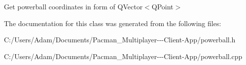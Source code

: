 Get powerball coordinates in form of Q\+Vector$<$\+Q\+Point$>$ 

The documentation for this class was generated from the following files\+:\begin{DoxyCompactItemize}
\item 
C\+:/\+Users/\+Adam/\+Documents/\+Pacman\+\_\+\+Multiplayer-\/-\/-\/\+Client-\/\+App/powerball.\+h\item 
C\+:/\+Users/\+Adam/\+Documents/\+Pacman\+\_\+\+Multiplayer-\/-\/-\/\+Client-\/\+App/powerball.\+cpp\end{DoxyCompactItemize}
